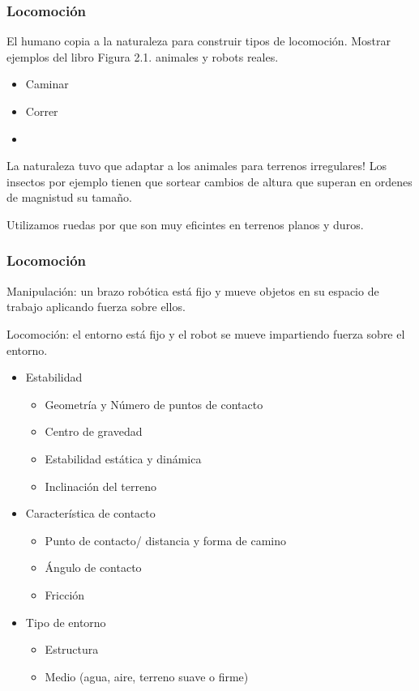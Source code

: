 
\begin{frame}
    \frametitle{Locomoción}
    El humano copia a la naturaleza para construir tipos de locomoción.
    Mostrar ejemplos del libro Figura 2.1. animales y robots reales.
    
    \begin{itemize}
        \item Caminar
        \item Correr
        \item
    \end{itemize}
    
    La naturaleza tuvo que adaptar a los animales para terrenos irregulares!
    Los insectos por ejemplo tienen que sortear cambios de altura que superan en ordenes de magnistud su tamaño.
    
    Utilizamos ruedas por que son muy eficintes en terrenos planos y duros.
    
\end{frame}


\begin{frame}
    \frametitle{Locomoción}
    
    Manipulación: un brazo robótica está fijo y mueve objetos en su espacio de trabajo aplicando fuerza sobre ellos.
    
    Locomoción: el entorno está fijo y el robot se mueve impartiendo fuerza sobre el entorno.
    \begin{itemize}
        \item Estabilidad
        \begin{itemize}
            \item Geometría y Número de puntos de contacto
            \item Centro de gravedad
            \item Estabilidad estática y dinámica
            \item Inclinación del terreno
        \end{itemize}
        \item Característica de contacto
        \begin{itemize}
            \item Punto de contacto/ distancia y forma de camino
            \item Ángulo de contacto
            \item Fricción
        \end{itemize}
        \item Tipo de entorno
        \begin{itemize}
            \item Estructura
            \item Medio (agua, aire, terreno suave o firme)
        \end{itemize}
    \end{itemize}
\end{frame}

